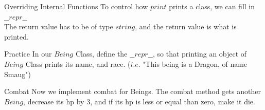 \documentclass{beamer}
\begin{document}
\begin{frame}{Overriding Internal Functions}
  To control how $print$ prints a class, we can fill in\\
  $\_\_repr\_\_$\\
  The return value has to be of type $string$, and the return value is what is printed.
\end{frame}

\begin{frame}{Practice}
  In our $Being$ Class, define the $\_\_repr\_\_$, so that printing an object
  of $Being$ Class prints its name, and race.
  ($i.e.$ "This being is a Dragon, of name Smaug")
\end{frame}

\begin{frame}{Combat}
  Now we implement combat for Beings.
  The combat method gets another $Being$, decrease its hp by $3$, and if its hp
  is less or equal than zero, make it die.
\end{frame}
\end{document}

